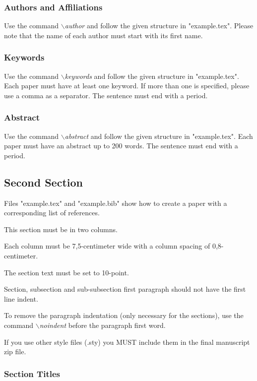 \documentclass[a4paper,twoside]{article}
\begin{document}
\subsubsection{Authors and Affiliations}

Use the command \textit{$\backslash$author} and follow the given structure in "example.tex". Please note that the name of each author must start with its first name.

\subsubsection{Keywords}

Use the command \textit{$\backslash$keywords} and follow the given structure in "example.tex". Each paper must have at least one keyword. If more than one is specified, please use a comma as a separator. The sentence must end with a period.

\subsubsection{Abstract}

Use the command \textit{$\backslash$abstract} and follow the given structure in "example.tex".
Each paper must have an abstract up to 200 words. The sentence
must end with a period.

\subsection{Second Section}

Files "example.tex" and "example.bib" show how to create a paper
with a corresponding list of references.

This section must be in two columns.

Each column must be 7,5-centimeter wide with a column spacing
of 0,8-centimeter.

The section text must be set to 10-point.

Section, subsection and sub-subsection first paragraph should not
have the first line indent.

To remove the paragraph indentation (only necessary for the
sections), use the command \textit{$\backslash$noindent} before the
paragraph first word.

If you use other style files (.sty) you MUST include them in the
final manuscript zip file.


\subsubsection{Section Titles}
\end{document}
